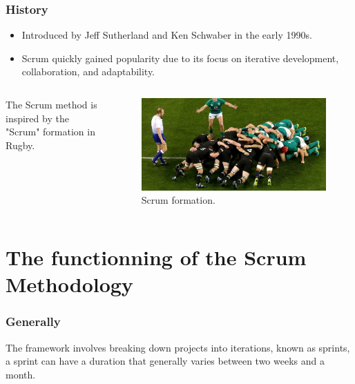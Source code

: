 \documentclass[
	11pt, %
]{beamer}
\begin{document}
\begin{frame}

	\frametitle{History}

	\begin{itemize}
		\item Introduced by Jeff Sutherland and Ken Schwaber  in the early 1990s.
		\item Scrum quickly gained popularity due to its focus on iterative development, collaboration, and adaptability.
	\end{itemize}

	\begin{columns}[c] %
		\begin{column}{0.45\textwidth} %
			The Scrum method is inspired by the "Scrum" formation in Rugby.
		\end{column}
		\begin{column}{0.5\textwidth} %
			\begin{figure}
				\includegraphics[width=0.8\linewidth]{scrum.jpg}
				\caption{Scrum formation.}
			\end{figure}
		\end{column}
	\end{columns}

\end{frame}


\section{The functionning of the Scrum Methodology}

\begin{frame}
	\frametitle{Generally}
	The framework involves breaking down projects into iterations,
	known as sprints, a sprint can have a duration
	that generally varies between two weeks and a month.
\end{frame}
\end{document}
